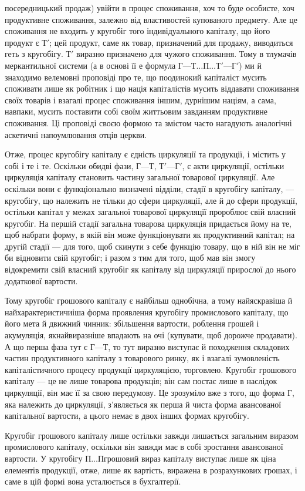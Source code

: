 \parcont{}  %
посередницький продаж) увійти в процес споживання, хоч то буде
особисте, хоч продуктивне споживання, залежно від властивостей купованого
предмету. Але це споживання не входить у кругобіг того індивідуального
капіталу, що його продукт є $Т'$; цей продукт, саме як товар,
призначений для продажу, виводиться геть з кругобігу. $Т'$ виразно
призначено для чужого споживання. Тому в тлумачів меркантильної
системи (а в основі її е формула $Г — Т\dots{} П\dots{} Т' — Г'$) ми й знаходимо
велемовні проповіді про те, що поодинокий капіталіст мусить споживати
лише як робітник і що нація капіталістів мусить віддавати споживання
своїх товарів і взагалі процес споживання іншим, дурнішим
націям, а сама, навпаки, мусить поставити собі своїм життьовим
завданням продуктивне споживання. Ці проповіді своєю формою та
змістом часто нагадують аналогічні аскетичні напоумлювання отців
церкви.

Отже, процес кругобігу капіталу є єдність циркуляції та продукції,
і містить у собі і те і те. Оскільки обидві фази, $Г — Т$, $Т' — Г'$, є акти
циркуляції, остільки циркуляція капіталу становить частину загальної
товарової циркуляції. Але оскільки вони є функціонально визначені відділи,
стадії в кругобігу капіталу, — кругобігу, що належить не тільки до
сфери циркуляції, але й до сфери продукції, остільки капітал у межах
загальної товарової циркуляції пророблює свій власний кругобіг. На першій
стадії загальна товарова циркуляція придається йому на те, щоб набрати
форму, в якій він може функціонувати як продуктивний капітал; на
другій стадії — для того, щоб скинути з себе функцію товару, що в ній
він не міг би відновити свій кругобіг; і разом з тим для того, щоб мав
він змогу відокремити свій власний кругобіг як капіталу від циркуляції
прирослої до нього додаткової вартости.

Тому кругобіг грошового капіталу є найбільш однобічна, а тому
найяскравіша й найхарактеристичиіша форма проявлення кругобігу промислового
капіталу, що його мета й движний чинник: збільшення вартости,
роблення грошей і акумуляція, якнайвиразніше впадають на очі (купувати,
щоб дорожче продавати). А що перша фаза тут є $Г — Т$, то тут
виразно виступає й походження складових частин продуктивного капіталу
з товарового ринку, як і взагалі зумовленість капіталістичного процесу
продукції циркуляцією, торговлею. Кругобіг грошового капіталу — це не
лише товарова продукція; він сам постає лише в наслідок циркуляції, він
має її за свою передумову. Це зрозуміло вже з того, що форма Г, яка
належить до циркуляції, з’являється як перша й чиста форма авансованої
капітальної вартости, а цього немає в двох інших формах кругобігу.

Кругобіг грошового капіталу лише остільки завжди лишається загальним
виразом промислового капіталу, оскільки він завжди має в собі зростання
авансованої вартости. У кругобігу $П\dots{} П г$рошовий вираз капіталу
виступає лише як ціна елементів продукції, отже, лише як вартість,
виражена в розрахункових грошах, і саме в цій формі вона усталюється
в бухгалтерії.
